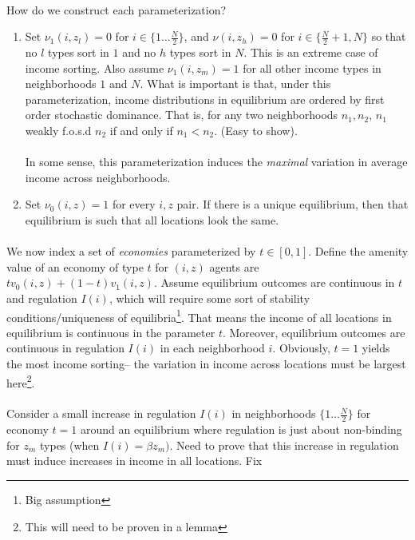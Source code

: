 \documentclass[11pt]{article}
\begin{document}
\paragraph*{}
How do we construct each parameterization?

\begin{enumerate}
	\item Set $\nu_{1}(i, z_{l}) = 0$ for $i \in \{1 \dots \frac{N}{2}\}$, and $\nu(i, z_{h}) = 0$ for $i \in \{\frac{N}{2} + 1, N\}$ so that no $l$ types sort in $1$ and no $h$ types sort in $N$. This is an extreme case of income sorting. Also assume $\nu_{1}(i, z_{m}) = 1$ for all other income types in neighborhoods $1$ and $N$. What is important is that, under this parameterization, income distributions in equilibrium are ordered by first order stochastic dominance. That is, for any two neighborhoods $n_{1}, n_{2}$, $n_{1}$ weakly f.o.s.d $n_{2}$ if and only if $n_{1} < n_{2}$. (Easy to show).
	
	\paragraph*{}
	In some sense, this parameterization induces the \textit{maximal} variation in average income across neighborhoods. 
	
	\item Set $\nu_{0}(i, z) = 1$ for every $i, z$ pair. If there is a unique equilibrium, then that equilibrium is such that
	 all locations look the same.
\end{enumerate}

\paragraph*{}
We now index a set of \textit{economies} parameterized by $t \in [0, 1]$. Define the amenity value of an economy of type $t$ for $(i, z)$ agents are $tv_{0}(i, z) + (1-t)v_{1}(i, z)$. Assume equilibrium outcomes are continuous in $t$ and regulation $I(i)$, which will require some sort of stability conditions/uniqueness of equilibria\footnote{Big assumption}. That means the income of all locations in equilibrium is continuous in the parameter $t$. Moreover,  equilibrium outcomes are continuous in regulation $I(i)$ in each neighborhood $i$. Obviously, $t = 1$ yields the most income sorting-- the variation in income across locations must be largest here\footnote{This will need to be proven in a lemma}. 

\paragraph*{}
Consider a small increase in regulation $I(i)$ in neighborhoods $\{1 \dots \frac{N}{2}\}$ for economy $t = 1$ around an equilibrium where regulation is just about non-binding for $z_{m}$ types (when $I(i) = \beta z_{m})$.  Need to prove that this increase in regulation must induce increases in income in all locations. Fix 
\end{document}
